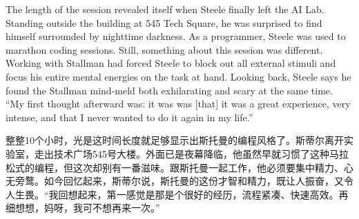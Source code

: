 \ifdefined\eng
The length of the session revealed itself when Steele finally left the AI Lab. Standing outside the building at 545 Tech Square, he was surprised to find himself surrounded by nighttime darkness. As a programmer, Steele was used to marathon coding sessions. Still, something about this session was different. Working with Stallman had forced Steele to block out all external stimuli and focus his entire mental energies on the task at hand. Looking back, Steele says he found the Stallman mind-meld both exhilarating and scary at the same time. ``My first thought afterward \ifdefined\vone was: it was \fi\ifdefined\vtwo was [that] it was \fi a great experience, very intense, and that I never wanted to do it again in my life.''
\fi

\ifdefined\chs
整整10个小时，光是这时间长度就足够显示出斯托曼的编程风格了。斯蒂尔离开实验室，走出技术广场545号大楼。外面已是夜幕降临，他虽然早就习惯了这种马拉松式的编程，但这次却别有一番滋味。跟斯托曼一起工作，他必须要集中精力、心无旁鹜。如今回忆起来，斯蒂尔说，斯托曼的这份才智和精力，既让人振奋，又令人生畏。``我回想起来，第一感觉是那是个很好的经历，流程紧凑、快速高效。再细想想，妈呀，我可不想再来一次。''
\fi

\theendnotes
\setcounter{endnote}{0}
